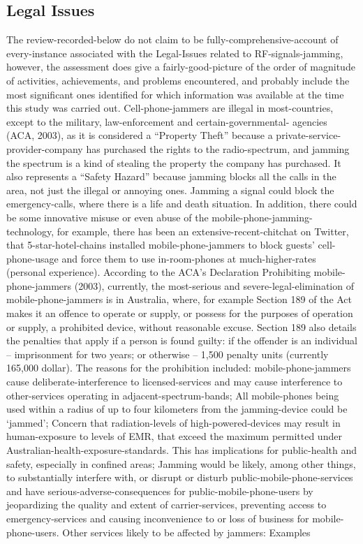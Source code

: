 \documentclass{article}
\begin{document}
\subsection{Legal Issues}
The  review-recorded-below do  not  claim to  be  fully-comprehensive-account  of  every-instance  associated  with the  Legal-Issues related to RF-signals-jamming, however, the assessment does give a fairly-good-picture of the order  of  magnitude  of  activities,  achievements,  and  problems  encountered,  and  probably  include  the  most significant ones identified for which information was available at the time this study was carried out.  Cell-phone-jammers are illegal in most-countries,  except  to  the  military,  law-enforcement and  certain-governmental- agencies (ACA, 2003), as it is considered  a “Property Theft” because a private-service-provider-company  has  purchased the  rights  to  the  radio-spectrum,  and  jamming the  spectrum  is  a  kind of  stealing  the property the company has  purchased.  It also represents a “Safety Hazard” because jamming blocks all the  calls in the area, not just the illegal or annoying ones. Jamming a signal could block the emergency-calls, where there is a  life  and  death  situation.  In  addition,  there  could  be  some  innovative  misuse  or  even  abuse  of  the  mobile-phone-jamming-technology,  for  example,  there  has  been  an  extensive-recent-chitchat  on  Twitter,  that  5-star-hotel-chains installed mobile-phone-jammers  to  block  guests’ cell-phone-usage and force  them to  use  in-room-phones at much-higher-rates (personal experience). According  to  the  ACA’s  Declaration  Prohibiting  mobile-phone-jammers  (2003),  currently,  the  most-serious and severe-legal-elimination of mobile-phone-jammers is in Australia, where, for example Section 189 of the Act makes it an offence to operate or supply, or possess for the purposes of operation or supply, a prohibited device, without reasonable excuse. Section 189 also details the penalties that apply if a person is found guilty: if the  offender  is  an  individual  –  imprisonment  for  two  years;  or  otherwise  –  1,500  penalty  units  (currently 165,000 dollar). The  reasons  for  the  prohibition  included:  mobile-phone-jammers  cause  deliberate-interference  to licensed-services and may cause interference to other-services operating in adjacent-spectrum-bands; All mobile-phones  being  used  within  a  radius  of  up  to  four  kilometers  from  the  jamming-device  could  be  ‘jammed’; Concern  that  radiation-levels  of high-powered-devices  may  result  in  human-exposure  to  levels of  EMR,  that exceed  the  maximum permitted  under Australian-health-exposure-standards.  This  has  implications for  public-health and  safety,  especially  in  confined  areas;  Jamming  would  be  likely,  among  other  things,  to  substantially interfere  with, or  disrupt  or  disturb  public-mobile-phone-services  and  have  serious-adverse-consequences  for public-mobile-phone-users  by  jeopardizing  the  quality  and  extent  of  carrier-services,  preventing  access  to emergency-services and causing inconvenience to or loss of business for mobile-phone-users. Other  services  likely  to  be  affected  by  jammers:  Examples  
\end{document}
